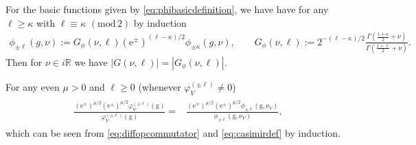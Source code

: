 \documentclass[12pt]{amsart}
\theoremstyle{definition}
\theoremstyle{remark}
\numberwithin{equation}{section}
\newcommand{\R}{{\mathbb R}}
\newcommand{\1}{{\mathbf 1}}
\newcommand{\g}{\mathrm{g}}
\renewcommand{\pmod}[1]{\,\,(\mathrm{mod}\,{#1})}
\begin{document}
For the basic functions given by \eqref{eq:phibasicdefinition}, we have have for any $\ell \geq \kappa$ with $\ell \equiv \kappa \pmod{2}$ by induction
\begin{align} \label{eq:raisingphi}
\phi_{\pm  \ell}(g,\nu)  := G_\phi(\nu,\ell) (\mathrm{e}^{\pm})^{ (\ell-\kappa)/2} \phi_{\pm \kappa}(g,\nu), \quad \quad   G_\phi(\nu,\ell) := 2^{-(\ell-\kappa)/2}\frac{ \Gamma(\frac{1+\kappa}{2}+\nu)} {\Gamma(\frac{1+\ell}{2}+\nu)}.
\end{align}
Then for $\nu \in i \R$ we have $|G(\nu,\ell)| = |G_\phi(\nu,\ell)|$. 

For any even $\mu >0$ and $\ell \geq 0$ (whenever $\varphi_V^{(\pm \ell)}\neq 0$)
\begin{align} \label{eq:upanddown}
\begin{split}
      \frac{(\mathrm{e}^{\mp})^{\mu/2}   (\mathrm{e}^{\pm})^{\mu/2} \varphi_V^{(\pm \ell)}(\g)}{\varphi_V^{(\pm \ell)}(\g)}   =&     \frac{(\mathrm{e}^{\mp})^{\mu/2}   (\mathrm{e}^{\pm})^{\mu/2} \phi_{\pm \ell}(\g,\nu_V)}{\phi_{\pm \ell}(\g,\nu_V)},
\end{split}
\end{align}
which can be seen from  \eqref{eq:diffopcommutator} and \eqref{eq:casimirdef} by induction.
\end{document}
